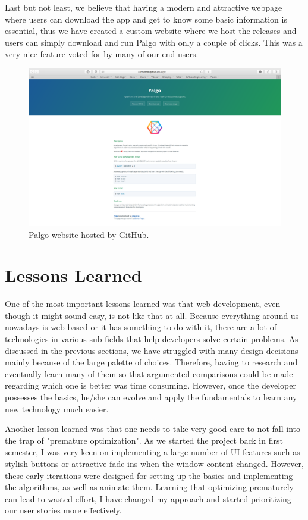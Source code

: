 \documentclass{l4proj}
\begin{document}
\pagebreak

Last but not least, we believe that having a modern and attractive webpage where users can download the app and get to
know some basic information is essential, thus we have created a custom website where we host the releases and users can simply
download and run Palgo with only a couple of clicks. This was a very nice feature voted for by many of our end users.

\begin{figure}[!ht]
    \centering
    \includegraphics[scale=0.3]{palgo-website}
    \caption{Palgo website hosted by GitHub.}
    \label{fig:palgo-website}
\end{figure}

\section{Lessons Learned}

One of the most important lessons learned was that web development, even though it might sound easy, is not like that at all.
Because everything around us nowadays is web-based or it has something to do with it, there are a lot of technologies in
various sub-fields that help developers solve certain problems. As discussed in the previous sections, we have struggled
with many design decisions mainly because of the large palette of choices. Therefore, having to research and eventually
learn many of them so that argumented comparisons could be made regarding which one is better was time consuming.
However, once the developer possesses the basics, he/she can evolve and apply the fundamentals to learn any new
technology much easier.

Another lesson learned was that one needs to take very good care to not fall into the trap of "premature optimization".
As we started the project back in first semester, I was very keen on implementing a large number of UI features such as
stylish buttons or attractive fade-ins when the window content changed. However, these early iterations were designed
for setting up the basics and implementing the algorithms, as well as animate them. Learning that optimizing prematurely
can lead to wasted effort, I have changed my approach and started prioritizing our user stories more effectively.
\end{document}
